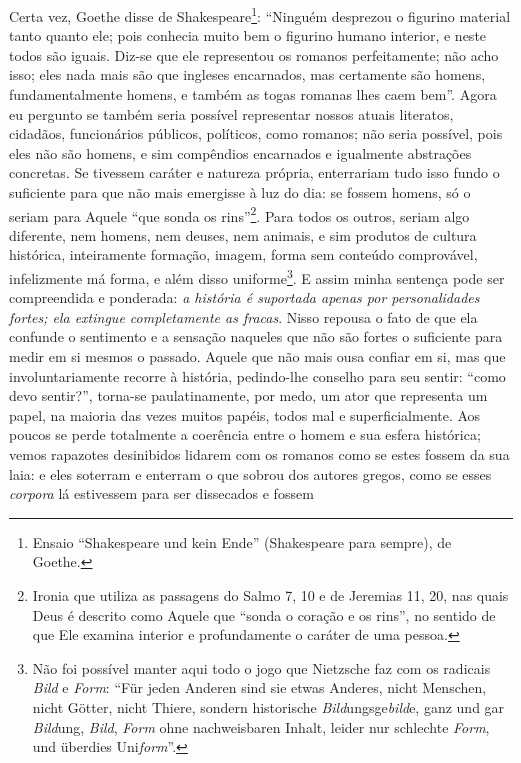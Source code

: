 Certa vez, Goethe disse de Shakespeare\footnote{Ensaio ``Shakespeare und
  kein Ende'' (Shakespeare para sempre), de Goethe.}: ``Ninguém
desprezou o figurino material tanto quanto ele; pois conhecia muito bem
o figurino humano interior, e neste todos são iguais. Diz-se que ele
representou os romanos perfeitamente; não acho isso; eles nada mais são
que ingleses encarnados, mas certamente são homens, fundamentalmente
homens, e também as togas romanas lhes caem bem''. Agora eu pergunto se
também seria possível representar nossos atuais literatos, cidadãos,
funcionários públicos, políticos, como romanos; não seria possível, pois
eles não são homens, e sim compêndios encarnados e igualmente abstrações
concretas. Se tivessem caráter e natureza própria, enterrariam tudo isso
fundo o suficiente para que não mais emergisse à luz do dia: se fossem
homens, só o seriam para Aquele ``que sonda os rins''\footnote{Ironia
  que utiliza as passagens do Salmo 7, 10 e de Jeremias 11, 20, nas quais Deus
  é descrito como Aquele que ``sonda o coração e os rins'', no sentido
  de que Ele examina interior e profundamente o caráter de uma
  pessoa.}. Para todos os outros, seriam algo diferente, nem homens, nem
deuses, nem animais, e sim produtos de cultura histórica, inteiramente
formação, imagem, forma sem conteúdo comprovável, infelizmente má forma,
e além disso uniforme\footnote{Não foi possível manter aqui todo o jogo
  que Nietz\-sche faz com os radicais \emph{Bild} e \emph{Form}: ``Für
  jeden Anderen sind sie etwas Anderes, nicht Menschen, nicht Götter,
  nicht Thiere, sondern historische \emph{Bild}ungsge\emph{bild}e, ganz
  und gar \emph{Bild}ung, \emph{Bild}, \emph{Form} ohne nachweisbaren
  Inhalt, leider nur schlechte \emph{Form}, und überdies
  Uni\emph{form}''.}. E assim minha sentença pode ser compreendida e
ponderada: \emph{a história é suportada apenas por personalidades
fortes; ela extingue completamente as fracas}. Nisso repousa o fato de
que ela confunde o sentimento e a sensação naqueles que não são fortes o
suficiente para medir em si mesmos o passado. Aquele que não mais ousa
confiar em si, mas que involuntariamente recorre à história, pedindo-lhe
conselho para seu sentir: ``como devo sentir?'', torna-se
paulatinamente, por medo, um ator que representa um papel, na maioria
das vezes muitos papéis, todos mal e superficialmente. Aos poucos se
perde totalmente a coerência entre o homem e sua esfera histórica; vemos
rapazotes desinibidos lidarem com os romanos como se estes fossem da sua
laia: e eles soterram e enterram o que sobrou dos autores gregos, como
se esses \emph{corpora} lá estivessem para ser dissecados e fossem
